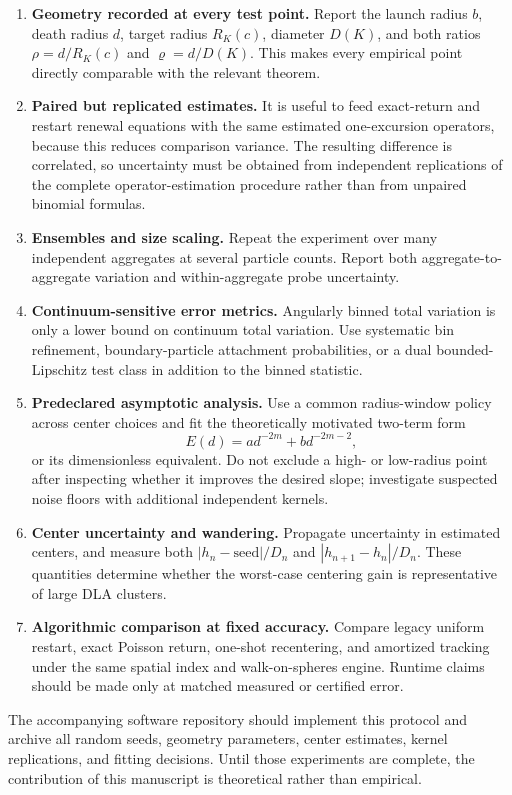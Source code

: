 \documentclass[11pt]{article}
\theoremstyle{mainthm}
\theoremstyle{definition}
\theoremstyle{remark}
\begin{document}
\begin{enumerate}
  \item \textbf{Geometry recorded at every test point.} Report the launch radius $b$, death radius $d$, target radius $R_K(c)$, diameter $D(K)$, and both ratios $\rho=d/R_K(c)$ and $\varrho=d/D(K)$. This makes every empirical point directly comparable with the relevant theorem.
  \item \textbf{Paired but replicated estimates.} It is useful to feed exact-return and restart renewal equations with the same estimated one-excursion operators, because this reduces comparison variance. The resulting difference is correlated, so uncertainty must be obtained from independent replications of the complete operator-estimation procedure rather than from unpaired binomial formulas.
  \item \textbf{Ensembles and size scaling.} Repeat the experiment over many independent aggregates at several particle counts. Report both aggregate-to-aggregate variation and within-aggregate probe uncertainty.
  \item \textbf{Continuum-sensitive error metrics.} Angularly binned total variation is only a lower bound on continuum total variation. Use systematic bin refinement, boundary-particle attachment probabilities, or a dual bounded-Lipschitz test class in addition to the binned statistic.
  \item \textbf{Predeclared asymptotic analysis.} Use a common radius-window policy across center choices and fit the theoretically motivated two-term form
  \[
    E(d)=a d^{-2m}+b d^{-2m-2},
  \]
  or its dimensionless equivalent. Do not exclude a high- or low-radius point after inspecting whether it improves the desired slope; investigate suspected noise floors with additional independent kernels.
  \item \textbf{Center uncertainty and wandering.} Propagate uncertainty in estimated centers, and measure both $|h_n-\text{seed}|/D_n$ and $|h_{n+1}-h_n|/D_n$. These quantities determine whether the worst-case centering gain is representative of large DLA clusters.
  \item \textbf{Algorithmic comparison at fixed accuracy.} Compare legacy uniform restart, exact Poisson return, one-shot recentering, and amortized tracking under the same spatial index and walk-on-spheres engine. Runtime claims should be made only at matched measured or certified error.
\end{enumerate}

The accompanying software repository should implement this protocol and archive all random seeds, geometry parameters, center estimates, kernel replications, and fitting decisions. Until those experiments are complete, the contribution of this manuscript is theoretical rather than empirical.
\end{document}
